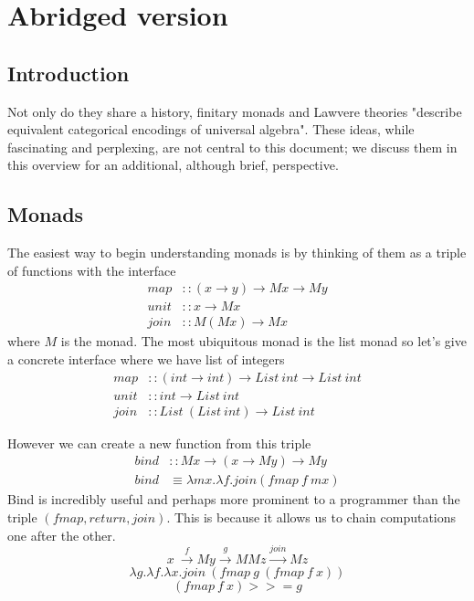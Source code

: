 \section{Abridged version}

\subsection{Introduction}
Not only do they share a history, finitary monads and Lawvere theories
"describe equivalent categorical encodings of universal algebra"\cite{riehl}.
These ideas, while fascinating and perplexing,
are not central to this document;
we discuss them in this overview for an additional,
although brief, perspective.

\subsection{Monads}
The easiest way to begin understanding monads is by thinking of them
as a triple of functions with the interface
\begin{equation}
  \begin{split}
    map  &:: (x \rightarrow y) \rightarrow M x \rightarrow M y \\
    unit &:: x \rightarrow M x                                 \\
    join &:: M (M x) \rightarrow M x
  \end{split}
\end{equation}
where $M$ is the monad. The most ubiquitous monad is the list monad
so let's give a concrete interface where we have list of integers
\begin{equation}
  \begin{split}
    map  &:: (int \rightarrow int) \rightarrow List\ int \rightarrow List\ int \\
    unit &:: int \rightarrow List\ int                                        \\
    join &:: List\ (List\ int) \rightarrow List\ int
  \end{split}
\end{equation}

However we can create a new function from this triple
\begin{align}
    bind &:: M x \rightarrow (x \rightarrow M y) \rightarrow M y \\
    bind &\equiv \lambda mx. \lambda f. join(fmap\ f\ mx)
\end{align}
Bind is incredibly useful and perhaps more prominent to a programmer than the triple $(fmap,return,join)$.
This is because it allows us to chain computations
one after the other.
\begin{equation}
    x\
    \stackrel{f}{\rightarrow} My
    \stackrel{g}{\rightarrow} MMz
    \stackrel{join}{\rightarrow} Mz
\end{equation}
\begin{equation}
    \lambda g.
    \lambda f.
    \lambda x.
    join\ (fmap\ g\ (fmap\ f\ x))
\end{equation}
\begin{equation}
    (fmap\ f\ x) >>= g
\end{equation}

